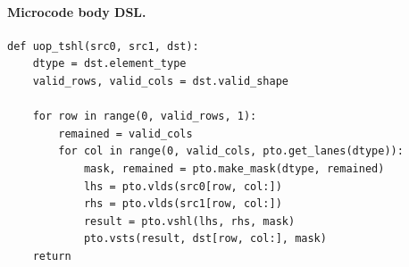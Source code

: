 \paragraph{Microcode body DSL.}
\begin{lstlisting}[style=ptocode]
def uop_tshl(src0, src1, dst):
    dtype = dst.element_type
    valid_rows, valid_cols = dst.valid_shape

    for row in range(0, valid_rows, 1):
        remained = valid_cols
        for col in range(0, valid_cols, pto.get_lanes(dtype)):
            mask, remained = pto.make_mask(dtype, remained)
            lhs = pto.vlds(src0[row, col:])
            rhs = pto.vlds(src1[row, col:])
            result = pto.vshl(lhs, rhs, mask)
            pto.vsts(result, dst[row, col:], mask)
    return
\end{lstlisting}
\Needspace{0.34\textheight}

